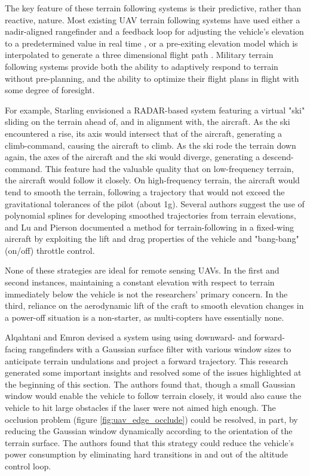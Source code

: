 \documentclass[10pt]{article}
\begin{document}
The key feature of these terrain following systems is their predictive, rather than reactive, nature. Most existing UAV terrain following systems have used either a nadir-aligned rangefinder and a feedback loop for adjusting the vehicle's elevation to a predetermined value in real time \cite{ArduPilot2017}, or a pre-exiting elevation model which is interpolated to generate a three dimensional flight path \cite{ArduPilot2017,Tudor2017,Samar2011}. Military terrain following systems provide both the ability to adaptively respond to terrain without pre-planning, and the ability to optimize their flight plans in flight with some degree of foresight. 

For example, Starling \cite{Starling1971} envisioned a RADAR-based system featuring a virtual "ski" sliding on the terrain ahead of, and in alignment with, the aircraft. As the ski encountered a rise, its axis would intersect that of the aircraft, generating a climb-command, causing the aircraft to climb. As the ski rode the terrain down again, the axes of the aircraft and the ski would diverge, generating a descend-command. This feature had the valuable quality that on low-frequency terrain, the aircraft would follow it closely. On high-frequency terrain, the aircraft would tend to smooth the terrain, following a trajectory that would not exceed the gravitational tolerances of the pilot (about 1g). Several authors \cite{MENON1991,Popovic2017,Lu1995,Rahim2011,Samar2011} suggest the use of polynomial splines for developing smoothed trajectories from terrain elevations, and Lu and Pierson \cite{Lu1995} documented a method for terrain-following in a fixed-wing aircraft by exploiting the lift and drag properties of the vehicle and "bang-bang" (on/off) throttle control. 

None of these strategies are ideal for remote sensing UAVs. In the first and second instances, maintaining a constant elevation with respect to terrain immediately below the vehicle is not the researchers' primary concern. In the third, reliance on the aerodynamic lift of the craft to smooth elevation changes in a power-off situation is a non-starter, as multi-copters have essentially none.

Alqahtani and Emron \cite{Alqahtani2018} devised a system using using downward- and forward-facing rangefinders with a Gaussian surface filter with various window sizes to anticipate terrain undulations and project a forward trajectory. This research generated some important insights and resolved some of the issues highlighted at the beginning of this section. The authors found that, though a small Gaussian window would enable the vehicle to follow terrain closely, it would also cause the vehicle to hit large obstacles if the laser were not aimed high enough. The occlusion problem (figure \ref{fig:uav_edge_occlude}) could be resolved, in part, by reducing the Gaussian window dynamically according to the orientation of the terrain surface. The authors found that this strategy could reduce the vehicle's power consumption by eliminating hard transitions in and out of the altitude control loop.
\end{document}
